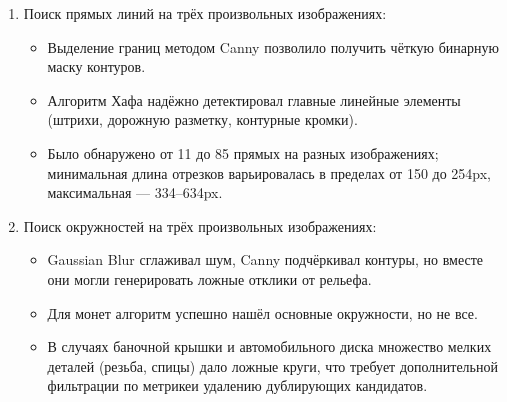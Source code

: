 \documentclass[a4paper,12pt]{article}
\begin{document}
\begin{enumerate}
  \item Поиск прямых линий на трёх произвольных изображениях:
    \begin{itemize}
      \item Выделение границ методом Canny позволило получить чёткую бинарную маску контуров.
      \item Алгоритм Хафа надёжно детектировал главные линейные элементы (штрихи, дорожную разметку, контурные кромки).
      \item Было обнаружено от 11 до 85 прямых на разных изображениях; минимальная длина отрезков варьировалась в пределах от 150 до 254px, максимальная --- 334–634px.
    \end{itemize}

  \item Поиск окружностей на трёх произвольных изображениях:
    \begin{itemize}
      \item Gaussian Blur сглаживал шум, Canny подчёркивал контуры, но вместе они могли генерировать ложные отклики от рельефа.
      \item Для монет алгоритм успешно нашёл основные окружности, но не все.
      \item В случаях баночной крышки и автомобильного диска множество мелких деталей (резьба, спицы) дало ложные круги, что требует дополнительной фильтрации по метрикеи удалению дублирующих кандидатов.
    \end{itemize}
\end{enumerate}
\end{document}
